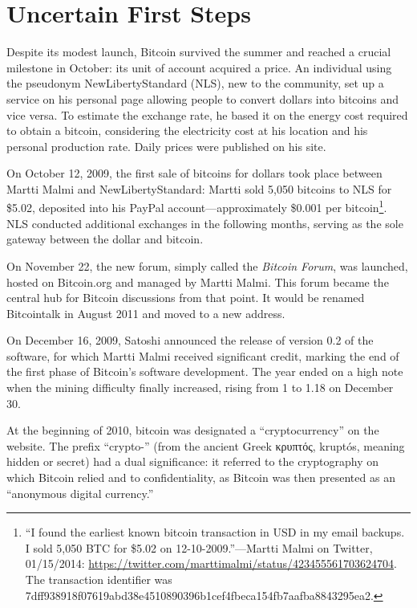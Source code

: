 \documentclass[
  a5paper,
  smalldemyvopaper,10pt,twoside,onecolumn,openright,extrafontsizes,hidelinks]{memoir}
\begin{document}
\section*{Uncertain First Steps}\label{des-premiers-pas-incertains}


Despite its modest launch, Bitcoin survived the summer and reached a
crucial milestone in October: its unit of account acquired a price. An
individual using the pseudonym NewLibertyStandard (NLS), new to the
community, set up a service on his personal page allowing people to
convert dollars into bitcoins and vice versa. To estimate the exchange
rate, he based it on the energy cost required to obtain a bitcoin,
considering the electricity cost at his location and his personal
production rate. Daily prices were published on his site.

On October 12, 2009, the first sale of bitcoins for dollars took place
between Martti Malmi and NewLibertyStandard: Martti sold 5,050 bitcoins
to NLS for \$5.02, deposited into his PayPal account---approximately
\$0.001 per bitcoin\footnote{``I found the earliest known bitcoin
  transaction in USD in my email backups. I sold 5,050 BTC for \$5.02 on
  12-10-2009.''---Martti Malmi on Twitter, 01/15/2014:
  \url{https://twitter.com/marttimalmi/status/423455561703624704}. The
  transaction identifier was
  7dff938918f07619abd38e4510890396b1cef4fbeca154fb7aafba8843295ea2.}.
NLS conducted additional exchanges in the following months, serving as
the sole gateway between the dollar and bitcoin.

On November 22, the new forum, simply called the \emph{Bitcoin Forum},
was launched, hosted on Bitcoin.org and managed by Martti Malmi. This
forum became the central hub for Bitcoin discussions from that point. It
would be renamed Bitcointalk in August 2011 and moved to a new address.

On December 16, 2009, Satoshi announced the release of version 0.2 of
the software, for which Martti Malmi received significant credit,
marking the end of the first phase of Bitcoin's software development.
The year ended on a high note when the mining difficulty finally
increased, rising from 1 to 1.18 on December 30.

At the beginning of 2010, bitcoin was designated a ``cryptocurrency'' on
the website. The prefix ``crypto-'' (from the ancient Greek κρυπτός,
kruptós, meaning hidden or secret) had a dual significance: it referred
to the cryptography on which Bitcoin relied and to confidentiality, as
Bitcoin was then presented as an ``anonymous digital currency.''
\end{document}
